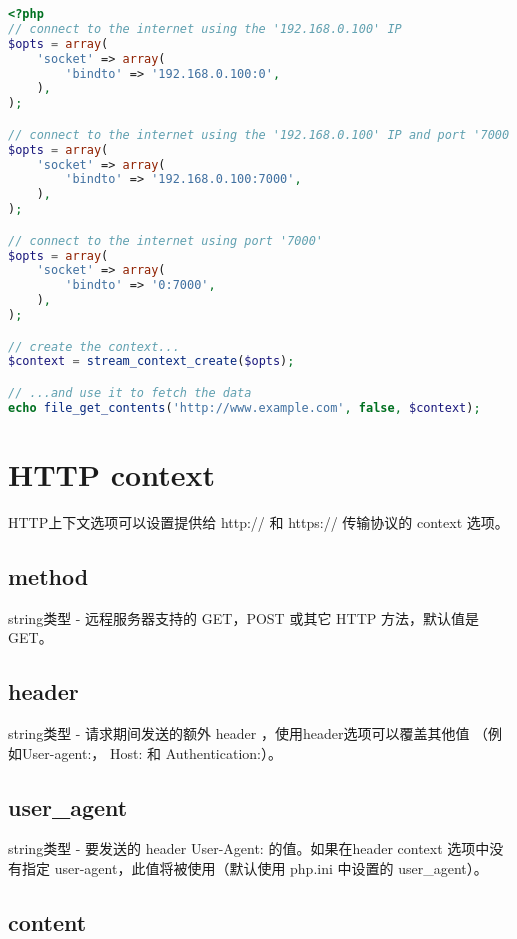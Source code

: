 \begin{lstlisting}[language=PHP]
<?php
// connect to the internet using the '192.168.0.100' IP
$opts = array(
    'socket' => array(
        'bindto' => '192.168.0.100:0',
    ),
);

// connect to the internet using the '192.168.0.100' IP and port '7000'
$opts = array(
    'socket' => array(
        'bindto' => '192.168.0.100:7000',
    ),
);

// connect to the internet using port '7000'
$opts = array(
    'socket' => array(
        'bindto' => '0:7000',
    ),
);

// create the context...
$context = stream_context_create($opts);

// ...and use it to fetch the data
echo file_get_contents('http://www.example.com', false, $context);
\end{lstlisting}





\section{HTTP context}

HTTP上下文选项可以设置提供给 http:// 和 https:// 传输协议的 context 选项。

\subsection{method}

string类型 - 远程服务器支持的 GET，POST 或其它 HTTP 方法，默认值是 GET。



\subsection{header}

string类型 - 请求期间发送的额外 header ，使用header选项可以覆盖其他值 （例如User-agent:， Host: 和 Authentication:）。

\subsection{user\_agent}

string类型 - 要发送的 header User-Agent: 的值。如果在header context 选项中没有指定 user-agent，此值将被使用（默认使用 php.ini 中设置的 user\_agent）。



\subsection{content}

